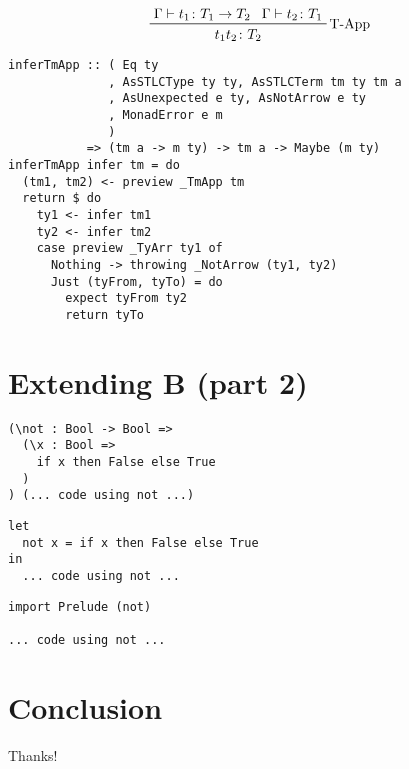 \documentclass[aspectration=169]{beamer}
\begin{document}
\begin{frame}[fragile]
  \begin{displaymath}  
    \prftree[r]{T-App}
    {\Gamma \vdash t_1 \colon T_1 \rightarrow T_2}
    {\Gamma \vdash t_2 \colon T_1}
    {t_1 t_2 \colon T_2}
  \end{displaymath}  
  \begin{verbatim}
inferTmApp :: ( Eq ty
              , AsSTLCType ty ty, AsSTLCTerm tm ty tm a
              , AsUnexpected e ty, AsNotArrow e ty
              , MonadError e m
              )
           => (tm a -> m ty) -> tm a -> Maybe (m ty)
inferTmApp infer tm = do
  (tm1, tm2) <- preview _TmApp tm
  return $ do
    ty1 <- infer tm1
    ty2 <- infer tm2
    case preview _TyArr ty1 of
      Nothing -> throwing _NotArrow (ty1, ty2)
      Just (tyFrom, tyTo) = do
        expect tyFrom ty2
        return tyTo
  \end{verbatim}  
\end{frame}

\section{Extending B (part 2)}

\begin{frame}[fragile]
  \begin{verbatim}
(\not : Bool -> Bool => 
  (\x : Bool => 
    if x then False else True
  )
) (... code using not ...)
  \end{verbatim}  
\end{frame}

\begin{frame}[fragile]
  \begin{verbatim}
let 
  not x = if x then False else True
in
  ... code using not ...
  \end{verbatim}  
\end{frame}

\begin{frame}[fragile]
  \begin{verbatim}
import Prelude (not)

... code using not ...
  \end{verbatim}  
\end{frame}

\section{Conclusion}

\begin{frame}[c]
Thanks!
\end{frame}
  
\end{document}
